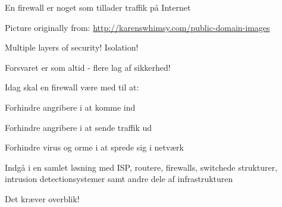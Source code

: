 \documentclass[Screen16to9,17pt]{foils}
\begin{document}
\centerline{\hlkbig En firewall er noget som {\color{red}tillader}
  traffik på Internet}


\centerline{Picture originally from: \url{http://karenswhimsy.com/public-domain-images}}



\centerline{\hlkbig\color{security6blue} Multiple layers of security! Isolation!}







\centerline{\hlkbig Forsvaret er som altid - flere lag af sikkerhed! }





\begin{list1}
\item Idag skal en firewall være med til at:
\begin{list2}
\item Forhindre angribere i at komme ind
\item Forhindre angribere i at sende traffik ud
\item Forhindre virus og orme i at sprede sig i netværk
\item Indgå i en samlet løsning med ISP, routere, firewalls, switchede
  strukturer, intrusion detectionsystemer samt andre dele af infrastrukturen
\end{list2}
\item Det kræver overblik!
\end{list1}



\end{document}
